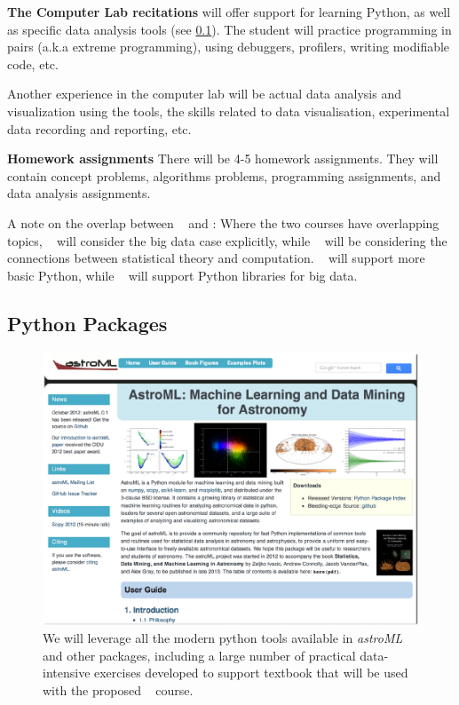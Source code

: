 {\bf The Computer Lab recitations} will offer support for learning
Python, as well as specific data analysis tools (see \ref{sec:python}).
The student will practice programming in pairs (a.k.a extreme
programming), using debuggers, profilers, writing modifiable code, etc.

Another experience in the computer lab will be actual data analysis
and visualization using the tools, the skills related to data
visualisation, experimental data recording and reporting, etc.

{\bf Homework assignments} There will be 4-5 homework
assignments. They will contain concept problems, algorithms problems,
programming assignments, and data analysis assignments.

A note on the overlap between \statcl~ and \astrocl: Where the two
courses have overlapping topics, \astrocl~ will consider the big data case
explicitly, while \statcl~ will be considering the connections between
statistical theory and computation. \statcl~ will support more basic
Python, while \astrocl~ will support Python libraries for big data.


\subsection{Python Packages} 
\label{sec:python}

\begin{figure}[!t]
\vskip -1.8in
\includegraphics[width=1.02\hsize,clip]{astroML.eps}
\vskip -2.0in
\caption{We will leverage all the modern python tools available in {\it astroML} and
other packages, including a large number of practical data-intensive exercises developed to
support textbook that will be used with the proposed \astrocl~ course.} 
\label{Fig:astroML}
\end{figure}


